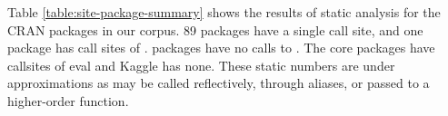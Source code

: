 \documentclass[conference]{IEEEtran}
\begin{document}


Table \ref{table:site-package-summary} shows the results of static analysis
for the CRAN packages in our corpus. 89 packages have a single call site,
and one package has  call sites of \eval.  packages have
no calls to \eval. The core packages have  callsites of eval and
Kaggle has none. These static numbers are under approximations as \eval may
be called reflectively, through aliases, or passed to a higher-order function.
\end{document}
